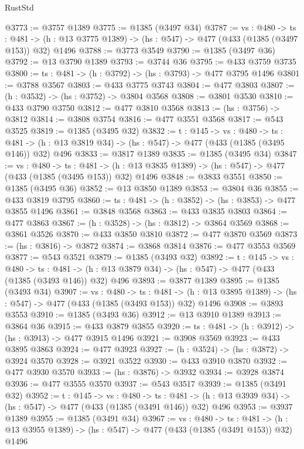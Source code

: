 \begin{lexlean}{RustStd}
\begin{coremodule}
{\begin{coremodule}
{{{{{{{@3773 := @3757 @1389
@3775 := @1385 (@3497 @34)
@3787 := {vs : @480} ->
  {ts : @481} -> (h : @13 @3775 @1389) -> (hs : @547) -> @477 (@433 (@1385 (@3497 @153)) @32) @1496
@3788 := @3773 @3549
@3790 := @1385 (@3497 @36)
@3792 := @13 @3790 @1389
@3793 := @3744 @36
@3795 := @433 @3759 @3735
@3800 := {ts : @481} -> (h : @3792) -> (hs : @3793) -> @477 @3795 @1496
@3801 := @3788 @3567
@3803 := @433 @3775 @3743
@3804 := @477 @3803
@3807 := (h : @3532) -> (hs : @3752) -> @3804 @3568
@3808 := @3801 @3530
@3810 := @433 @3790 @3750
@3812 := @477 @3810 @3568
@3813 := (hs : @3756) -> @3812
@3814 := @3808 @3754
@3816 := @477 @3551 @3568
@3817 := @543 @3525
@3819 := @1385 (@3495 @32)
@3832 := {t : @145} ->
  {vs : @480} ->
  {ts : @481} -> (h : @13 @3819 @34) -> (hs : @547) -> @477 (@433 (@1385 (@3495 @146)) @32) @496
@3833 := @3817 @1389
@3835 := @1385 (@3495 @34)
@3847 := {vs : @480} ->
  {ts : @481} -> (h : @13 @3835 @1389) -> (hs : @547) -> @477 (@433 (@1385 (@3495 @153)) @32) @1496
@3848 := @3833 @3551
@3850 := @1385 (@3495 @36)
@3852 := @13 @3850 @1389
@3853 := @3804 @36
@3855 := @433 @3819 @3795
@3860 := {ts : @481} -> (h : @3852) -> (hs : @3853) -> @477 @3855 @1496
@3861 := @3848 @3568
@3863 := @433 @3835 @3803
@3864 := @477 @3863
@3867 := (h : @3528) -> (hs : @3812) -> @3864 @3569
@3868 := @3861 @3526
@3870 := @433 @3850 @3810
@3872 := @477 @3870 @3569
@3873 := (hs : @3816) -> @3872
@3874 := @3868 @3814
@3876 := @477 @3553 @3569
@3877 := @543 @3521
@3879 := @1385 (@3493 @32)
@3892 := {t : @145} ->
  {vs : @480} ->
  {ts : @481} -> (h : @13 @3879 @34) -> (hs : @547) -> @477 (@433 (@1385 (@3493 @146)) @32) @496
@3893 := @3877 @1389
@3895 := @1385 (@3493 @34)
@3907 := {vs : @480} ->
  {ts : @481} -> (h : @13 @3895 @1389) -> (hs : @547) -> @477 (@433 (@1385 (@3493 @153)) @32) @1496
@3908 := @3893 @3553
@3910 := @1385 (@3493 @36)
@3912 := @13 @3910 @1389
@3913 := @3864 @36
@3915 := @433 @3879 @3855
@3920 := {ts : @481} -> (h : @3912) -> (hs : @3913) -> @477 @3915 @1496
@3921 := @3908 @3569
@3923 := @433 @3895 @3863
@3924 := @477 @3923
@3927 := (h : @3524) -> (hs : @3872) -> @3924 @3570
@3928 := @3921 @3522
@3930 := @433 @3910 @3870
@3932 := @477 @3930 @3570
@3933 := (hs : @3876) -> @3932
@3934 := @3928 @3874
@3936 := @477 @3555 @3570
@3937 := @543 @3517
@3939 := @1385 (@3491 @32)
@3952 := {t : @145} ->
  {vs : @480} ->
  {ts : @481} -> (h : @13 @3939 @34) -> (hs : @547) -> @477 (@433 (@1385 (@3491 @146)) @32) @496
@3953 := @3937 @1389
@3955 := @1385 (@3491 @34)
@3967 := {vs : @480} ->
  {ts : @481} -> (h : @13 @3955 @1389) -> (hs : @547) -> @477 (@433 (@1385 (@3491 @153)) @32) @1496
}}}}}}}
\end{coremodule}}
\end{coremodule}
\end{lexlean}
